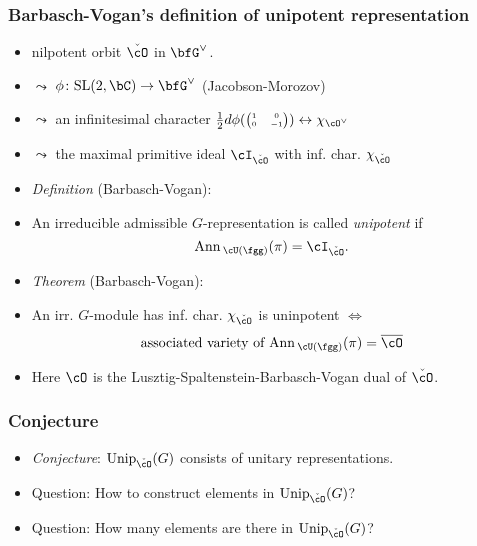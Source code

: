 \documentclass[t,mathserif,11pt,handout,usenames,dvipsnames]{beamer}
\theoremstyle{plain}
\theoremstyle{definition}
\def\Ann{{\mathrm{Ann}\,}}
\def\SL{{\mathrm{SL}}}
\def\Unip{{\mathrm{Unip}}}
\def\half{{\frac{1}{2}}}
\def\ckcO{{\check{\cO}}}
\def\blue{\color{blue}}
\def\red{\color{red}}
\let\oldemph\emph
\def\emph#1{\oldemph{\blue #1}}
\begin{document}
\begin{frame}[label=DU]
  \frametitle{Barbasch-Vogan's definition of unipotent representation}
  \begin{itemize}[<+->]

  \item[]  nilpotent orbit $\ckcO$ in  
    $\bfG^\vee$.  
\item[] \hspace{4em} $\leadsto$ $\phi\colon \SL(2,\bC)\rightarrow \bfG^\vee$
(Jacobson-Morozov)
  \item[] \hspace{4em} $\leadsto$ an infinitesimal character $\half d\phi({\tiny\begin{pmatrix} 1 & 0 \\ 0 & -1\\ \end{pmatrix} })\leftrightarrow \chi_{\cO^\vee}$  
 
\item[] \hspace{4em} $\leadsto$ the maximal primitive ideal $\cI_\ckcO$ with inf. char.  $\chi_{\ckcO}$
\item  \emph{Definition} (Barbasch-Vogan):
\item [] An irreducible admissible $G$-representation is called 
     \emph{unipotent} if 
     \[
      \Ann_{\cU(\fgg)}(\pi) = \cI_{\ckcO}.
     \]
\item  \emph{Theorem} (Barbasch-Vogan):
\item[]
 An irr. $G$-module has inf. char. $\chi_{\ckcO}$ is uninpotent 
$\Longleftrightarrow$
 \[
 \text{associated variety of } \Ann_{\cU(\fgg)}(\pi) = \overline{\cO}
 \]
\item[] Here $\cO$ is the  Lusztig-Spaltenstein-Barbasch-Vogan dual of $\ckcO$.
  \end{itemize}
\end{frame}


\begin{frame}[label=DU]
  \frametitle{Conjecture}
  \begin{itemize}[<+->]
  \item \emph{Conjecture}: $\Unip_{\ckcO}(G)$ consists of {\red unitary} representations.
  \item Question: How to construct elements in $\Unip_{\ckcO}(G)$?
  \item Question: How many elements are there in $\Unip_{\ckcO}(G)$?
  \end{itemize}
\end{frame}
\end{document}
